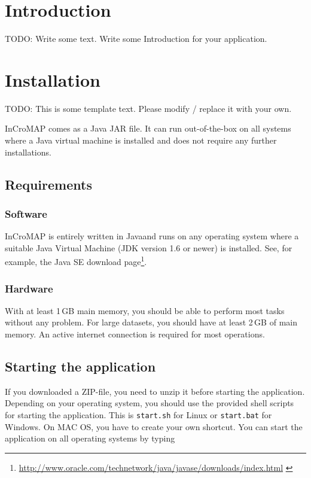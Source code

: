\chapter{Introduction}

TODO: Write some text. Write some Introduction for your application.


\chapter{Installation}

TODO: This is some template text. Please modify / replace it with your own.

InCroMAP comes as a Java JAR file. It can run out-of-the-box on all systems where a Java virtual machine is installed and does not require any further installations.

\section{Requirements}
\subsection{Software}
InCroMAP is entirely written in Java\TTra and runs on any operating system where a suitable Java Virtual Machine (JDK version 1.6 or newer) is installed. See, for example, the Java SE download page\footnote{\url{http://www.oracle.com/technetwork/java/javase/downloads/index.html}
\label{fn:jvmldl}}.

\subsection{Hardware}
With at least 1\,GB main memory, you should be able to perform most tasks without any problem.
For large datasets, you should have at least 2\,GB of main memory. \newline
An active internet connection is required for most operations.

\section{Starting the application}
\label{startingTheProgram}
If you downloaded a ZIP-file, you need to unzip it before starting the application. Depending on your operating system, you should use the provided shell scripts for starting the application. This is \texttt{start.sh} for Linux or \texttt{start.bat} for Windows. On MAC OS, you have to create your own shortcut. You can start the application on all operating systems by typing

